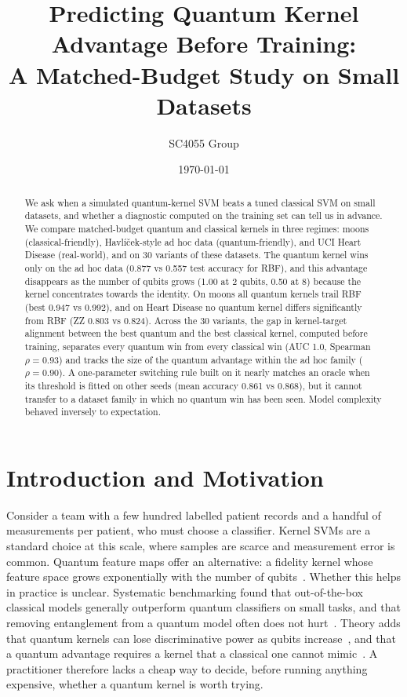 \documentclass[11pt,a4paper]{article}
\title{Predicting Quantum Kernel Advantage Before Training:\\A Matched-Budget Study on Small Datasets}
\author{SC4055 Group \todo{number}\\ \todo{names and matriculation numbers}}
\date{\today}
\begin{document}
\maketitle

\begin{abstract}
We ask when a simulated quantum-kernel SVM beats a tuned classical SVM on small datasets, and whether a diagnostic computed on the training set can tell us in advance. We compare matched-budget quantum and classical kernels in three regimes: moons (classical-friendly), Havl\'i\v{c}ek-style ad hoc data (quantum-friendly), and UCI Heart Disease (real-world), and on 30 variants of these datasets. The quantum kernel wins only on the ad hoc data (0.877 vs 0.557 test accuracy for RBF), and this advantage disappears as the number of qubits grows (1.00 at 2 qubits, 0.50 at 8) because the kernel concentrates towards the identity. On moons all quantum kernels trail RBF (best 0.947 vs 0.992), and on Heart Disease no quantum kernel differs significantly from RBF (ZZ 0.803 vs 0.824). Across the 30 variants, the gap in kernel-target alignment between the best quantum and the best classical kernel, computed before training, separates every quantum win from every classical win (AUC 1.0, Spearman $\rho=0.93$) and tracks the size of the quantum advantage within the ad hoc family ($\rho=0.90$). A one-parameter switching rule built on it nearly matches an oracle when its threshold is fitted on other seeds (mean accuracy 0.861 vs 0.868), but it cannot transfer to a dataset family in which no quantum win has been seen. Model complexity behaved inversely to expectation.
\end{abstract}

\section{Introduction and Motivation}
Consider a team with a few hundred labelled patient records and a handful of measurements per patient, who must choose a classifier. Kernel SVMs are a standard choice at this scale, where samples are scarce and measurement error is common. Quantum feature maps offer an alternative: a fidelity kernel whose feature space grows exponentially with the number of qubits~\cite{havlicek2019,schuld2019}. Whether this helps in practice is unclear. Systematic benchmarking found that out-of-the-box classical models generally outperform quantum classifiers on small tasks, and that removing entanglement from a quantum model often does not hurt~\cite{bowles2024}. Theory adds that quantum kernels can lose discriminative power as qubits increase~\cite{thanasilp2024}, and that a quantum advantage requires a kernel that a classical one cannot mimic~\cite{huang2021}. A practitioner therefore lacks a cheap way to decide, before running anything expensive, whether a quantum kernel is worth trying.
\end{document}
